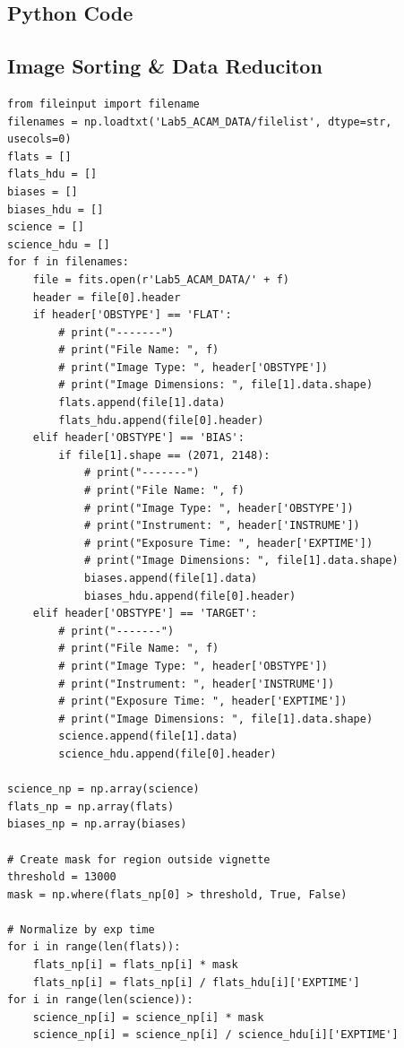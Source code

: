 \documentclass{article}
\begin{document}
\newpage

\printbibliography

\newpage

\begin{appendices}
\section{Python Code}
\subsection{Image Sorting \& Data Reduciton}
\begin{scriptsize}
\begin{verbatim}
from fileinput import filename
filenames = np.loadtxt('Lab5_ACAM_DATA/filelist', dtype=str, usecols=0)
flats = []
flats_hdu = []
biases = []
biases_hdu = []
science = []
science_hdu = []
for f in filenames:
    file = fits.open(r'Lab5_ACAM_DATA/' + f)
    header = file[0].header
    if header['OBSTYPE'] == 'FLAT':
        # print("-------")
        # print("File Name: ", f)
        # print("Image Type: ", header['OBSTYPE'])
        # print("Image Dimensions: ", file[1].data.shape)
        flats.append(file[1].data)
        flats_hdu.append(file[0].header)
    elif header['OBSTYPE'] == 'BIAS':
        if file[1].shape == (2071, 2148):
            # print("-------")
            # print("File Name: ", f)
            # print("Image Type: ", header['OBSTYPE'])
            # print("Instrument: ", header['INSTRUME'])
            # print("Exposure Time: ", header['EXPTIME'])
            # print("Image Dimensions: ", file[1].data.shape)
            biases.append(file[1].data)
            biases_hdu.append(file[0].header)
    elif header['OBSTYPE'] == 'TARGET':
        # print("-------")
        # print("File Name: ", f)
        # print("Image Type: ", header['OBSTYPE'])
        # print("Instrument: ", header['INSTRUME'])
        # print("Exposure Time: ", header['EXPTIME'])
        # print("Image Dimensions: ", file[1].data.shape)
        science.append(file[1].data)
        science_hdu.append(file[0].header)
        
science_np = np.array(science)
flats_np = np.array(flats)
biases_np = np.array(biases)

# Create mask for region outside vignette
threshold = 13000
mask = np.where(flats_np[0] > threshold, True, False)

# Normalize by exp time
for i in range(len(flats)):
    flats_np[i] = flats_np[i] * mask
    flats_np[i] = flats_np[i] / flats_hdu[i]['EXPTIME']
for i in range(len(science)):
    science_np[i] = science_np[i] * mask
    science_np[i] = science_np[i] / science_hdu[i]['EXPTIME']
    

\end{verbatim}
\end{scriptsize}
\end{appendices}
\end{document}
